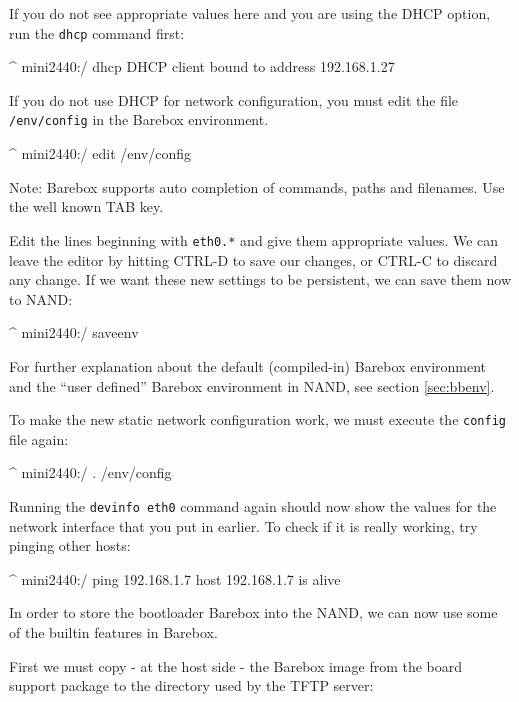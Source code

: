 If you do not see appropriate values here and you are using the DHCP option, run
the \texttt{dhcp} command first:

\begin{ptxshell}[escapechar=|]{^}
mini2440:/ dhcp
DHCP client bound to address 192.168.1.27
\end{ptxshell}

If you do not use DHCP for network configuration, you must edit the file
\texttt{/env/config} in the Barebox environment.

\begin{ptxshell}[escapechar=|]{^}
mini2440:/ edit /env/config
\end{ptxshell}

Note: Barebox supports auto completion of commands, paths and filenames. Use
the well known TAB key.

Edit the lines beginning with \texttt{eth0.*} and give them appropriate values.
We can leave the editor by hitting CTRL-D to save our changes, or CTRL-C to
discard any change. If we want these new settings to be persistent, we can save
them now to NAND:

\begin{ptxshell}[escapechar=|]{^}
mini2440:/ saveenv
\end{ptxshell}

For further explanation about the default (compiled-in) Barebox environment
and the “user defined” Barebox environment in NAND, see section \ref{sec:bbenv}.

To make the new static network configuration work, we must execute the
\texttt{config} file again:

\begin{ptxshell}[escapechar=|]{^}
mini2440:/ . /env/config
\end{ptxshell}

Running the \texttt{devinfo eth0} command again should now show the values for
the network interface that you put in earlier. To check if it is really working,
try pinging other hosts:

\begin{ptxshell}[escapechar=|]{^}
mini2440:/ ping 192.168.1.7
host 192.168.1.7 is alive
\end{ptxshell}

In order to store the bootloader Barebox into the NAND, we can now use
some of the builtin features in Barebox.

First we must copy - at the host side - the Barebox image from the board support
package to the directory used by the TFTP server:


